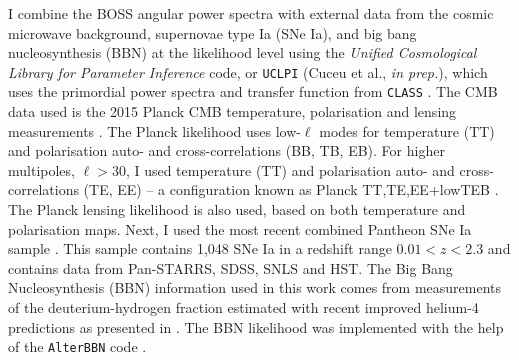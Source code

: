 \qquad I combine the BOSS angular power spectra with external data from the cosmic microwave background, supernovae type Ia (SNe Ia), and big bang nucleosynthesis (BBN) at the likelihood level using the \textit{Unified Cosmological Library for Parameter Inference} code, or \texttt{UCLPI} (Cuceu et al., \textit{in prep.}), which uses the primordial power spectra and transfer function from \texttt{CLASS} \citep{Class}. The CMB data used is the 2015 Planck CMB temperature, polarisation and lensing measurements \citep{PlanckLikelihood2015}. The Planck likelihood uses low-$\ell$ modes for temperature (TT) and polarisation auto- and cross-correlations (BB, TB, EB). For higher multipoles, $\ell > 30$, I used temperature (TT) and polarisation auto- and cross-correlations (TE, EE) -- a configuration known as Planck TT,TE,EE+lowTEB \citep{PlanckLikelihood2015,PlanckResults2015}. The Planck lensing likelihood is also used, based on both temperature and polarisation maps. Next, I used  the most recent combined Pantheon SNe Ia sample \citep{2018Pantheon}. This sample contains 1,048 SNe Ia in a redshift range $0.01 < z < 2.3$ and contains data from Pan-STARRS, SDSS, SNLS and HST. The Big Bang Nucleosynthesis (BBN) information used in this work comes from measurements of the deuterium-hydrogen fraction estimated with recent improved helium-4 predictions as presented in \cite{2018BBN-Measurements}. The BBN likelihood was implemented with the help of the \texttt{AlterBBN} code \citep{2018AlterBBN}. 



